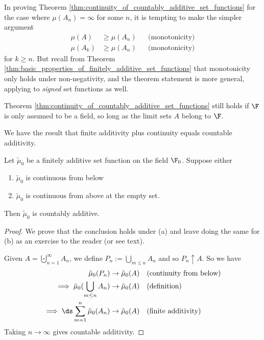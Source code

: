 \documentclass{article} %
\newcommand{\fasf}{\tilde{\mu}_0}
\newenvironment{alphabate}
    {\begin{enumerate}[label=\alph*)]}
	{\end{enumerate} }
\begin{document}
\begin{remark}

In proving Theorem \ref{thm:continuity_of_countably_additive_set_functions}  for the case where $\mu(A_n) = \infty$ for some $n$, it is tempting to make the simpler argument 
\begin{align*}
\mu(A) & \geq \mu(A_n) && \text{(monotonicity)}\\	
\mu(A_k) & \geq \mu(A_n) && \text{(monotonicity)}	 
\end{align*}
for $k \geq n$.  But recall from Theorem \ref{thm:basic_properties_of_finitely_additive_set_functions} that monotonicity only holds under non-negativity, and the theorem statement is more general, applying to \textit{signed} set functions as well. 
\end{remark}

\begin{remark}
Theorem \ref{thm:continuity_of_countably_additive_set_functions} still holds if $\F$ is only assumed to be a field, so long as the limit sets $A$ belong to $\F$.  %
\end{remark}

We have the result that finite additivity plus continuity equals countable additivity. 

\begin{theorem}
Let $\fasf$ be a finitely additive set function on the field $\F_0$.  Suppose either
\begin{alphabate}
\item $\fasf$ is continuous from below
\item $\fasf$ is continuous from above at the empty set.	
\end{alphabate}
Then $\fasf$ is countably additive.
\label{thm:finite_additivity_plus_continuity_gives_countable_additivity}
\end{theorem}

\begin{proof}
We prove that the conclusion holds under (a) and leave doing the same for (b) as an exercise to the reader (or see text). 	%

Given $A = \bigcupdot_{n=1}^\infty A_n$, we define $P_n := \bigcup_{m \leq n} A_n$ and so $P_n \uparrow A$.   So we have
\begin{align*}
\fasf(P_n) &\to \fasf(A) && \text{(continuity from below)} \\
\implies \fasf(\bigcup_{m \leq n} A_n) &\to \fasf(A) && \text{(definition)} \\	
\implies \ds\sum_{m=1}^n \fasf(A_n) &\to \fasf(A) && \text{(finite additivity)} \\
\end{align*}
Taking $n \to \infty$ gives countable additivity.
\end{proof}
\end{document}
